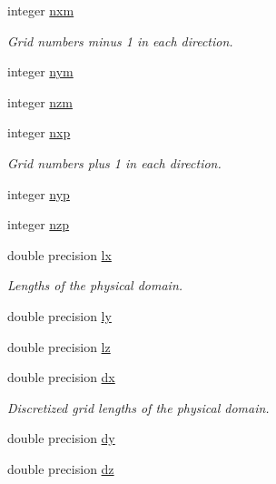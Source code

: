 \textbf{ }\par
\begin{DoxyCompactItemize}
\item 
integer \hyperlink{namespaceglobal_aa37f5fe09139707ac1723302127436b1}{nxm}
\begin{DoxyCompactList}\small\item\em Grid numbers minus 1 in each direction. \end{DoxyCompactList}\item 
integer \hyperlink{namespaceglobal_a9852876e90514ccc182c0ed0b27cdaad}{nym}
\item 
integer \hyperlink{namespaceglobal_a76e27e2001870f6606e51d33a2c70f60}{nzm}
\end{DoxyCompactItemize}

\textbf{ }\par
\begin{DoxyCompactItemize}
\item 
integer \hyperlink{namespaceglobal_a227001d8177d0295b61a39948436adaa}{nxp}
\begin{DoxyCompactList}\small\item\em Grid numbers plus 1 in each direction. \end{DoxyCompactList}\item 
integer \hyperlink{namespaceglobal_a868bbe46b97daa7ff6c962fff16bbf2f}{nyp}
\item 
integer \hyperlink{namespaceglobal_ab376cd7d790b630ad83ffcded3c56366}{nzp}
\end{DoxyCompactItemize}

\textbf{ }\par
\begin{DoxyCompactItemize}
\item 
double precision \hyperlink{namespaceglobal_ac5d2ea39fc192fbb8354e665dc91b759}{lx}
\begin{DoxyCompactList}\small\item\em Lengths of the physical domain. \end{DoxyCompactList}\item 
double precision \hyperlink{namespaceglobal_a6a6ee40bbab9e114aa217f7d8570b924}{ly}
\item 
double precision \hyperlink{namespaceglobal_a9d90050855b894304d8b4272c6a9ee71}{lz}
\end{DoxyCompactItemize}

\textbf{ }\par
\begin{DoxyCompactItemize}
\item 
double precision \hyperlink{namespaceglobal_a9c5f8c3cf5f9b496608059fc13776b4c}{dx}
\begin{DoxyCompactList}\small\item\em Discretized grid lengths of the physical domain. \end{DoxyCompactList}\item 
double precision \hyperlink{namespaceglobal_aa2d01c0b9c06af88ae13136658fc3dd9}{dy}
\item 
double precision \hyperlink{namespaceglobal_a4015487c561985eefa8cabc39f591540}{dz}
\end{DoxyCompactItemize}



